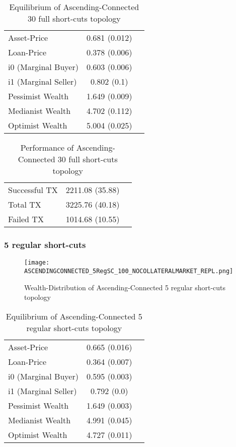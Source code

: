 \documentclass[Bachelorarbeit.tex]{subfiles}
\begin{document}
\begin{table}[H]
	\caption{Equilibrium of Ascending-Connected 30 full short-cuts topology}
	\centering
	\begin{tabular} { l c r }
		\hline
		Asset-Price & 0.681 (0.012) \\
		Loan-Price & 0.378 (0.006) \\
		i0 (Marginal Buyer) & 0.603 (0.006) \\
		i1 (Marginal Seller) & 0.802 (0.1) \\
		Pessimist Wealth & 1.649 (0.009) \\
		Medianist Wealth & 4.702 (0.112) \\
		Optimist Wealth & 5.004 (0.025) \\
		\hline
	\end{tabular}
\end{table} 

\begin{table}[H]
	\caption{Performance of Ascending-Connected 30 full short-cuts topology}
	\centering
	\begin{tabular} { l c r }
		\hline
		Successful TX & 2211.08 (35.88) \\
		Total TX & 3225.76 (40.18) \\
		Failed TX & 1014.68 (10.55) \\
		\hline
	\end{tabular}
\end{table}


\subsubsection{5 regular short-cuts}
\begin{figure}[H]
	\centering
  \texttt{[image: ASCENDINGCONNECTED\_5RegSC\_100\_NOCOLLATERALMARKET\_REPL.png]}
	\caption{Wealth-Distribution of Ascending-Connected 5 regular short-cuts topology}
	\label{fig1}
\end{figure}

\begin{table}[H]
	\caption{Equilibrium of Ascending-Connected 5 regular short-cuts topology}
	\centering
	\begin{tabular} { l c r }
		\hline
		Asset-Price & 0.665 (0.016) \\
		Loan-Price & 0.364 (0.007) \\
		i0 (Marginal Buyer) & 0.595 (0.003) \\
		i1 (Marginal Seller) & 0.792 (0.0) \\
		Pessimist Wealth & 1.649 (0.003) \\
		Medianist Wealth & 4.991 (0.045) \\
		Optimist Wealth & 4.727 (0.011) \\
		\hline
	\end{tabular}
\end{table} 
\end{document}
